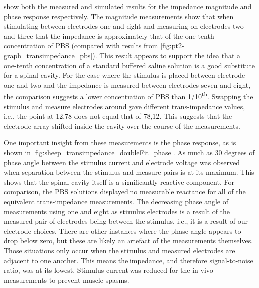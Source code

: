      show both the measured and simulated results for the impedance magnitude and phase response respectively.
    The magnitude measurements show that when stimulating between electrodes one and eight and measuring on electrodes two and three that the impedance is approximately that of the one-tenth concentration of PBS (compared with results from \cref{fig:pt2-graph_transimpedance_pbs}).
    This result appears to support the idea that a one-tenth concentration of a standard buffered saline solution is a good substitute for a spinal cavity.
    For the case where the stimulus is placed between electrode one and two and the impedance is measured between electrodes seven and eight, the comparison suggests a lower concentration of PBS than 1/10\textsuperscript{th}.
    Swapping the stimulus and measure electrodes around gave different trans-impedance values, i.e., the point at 12,78 does not equal that of 78,12.
    This suggests that the electrode array shifted inside the cavity over the course of the measurements.

    One important insight from these measurements is the phase response, as is shown in \cref{fig:sheep_transimpedance_doubleFit_phase}.
    As much as 30 degrees of phase angle between the stimulus current and electrode voltage was observed when separation between the stimulus and measure pairs is at its maximum.
    This shows that the spinal cavity itself is a significantly reactive component.
    For comparison, the PBS solutions displayed no measurable reactance for all of the equivalent trans-impedance measurements.
    The decreasing phase angle of measurements using one and eight as stimulus electrodes is a result of the measured pair of electrodes being between the stimulus, i.e., it is a result of our electrode choices.
    There are other instances where the phase angle appears to drop below zero, but these are likely an artefact of the measurements themselves.
    Those situations only occur when the stimulus and measured electrodes are adjacent to one another.
    This means the impedance, and therefore signal-to-noise ratio, was at its lowest.
    Stimulus current was reduced for the in-vivo measurements to prevent muscle spasms.

